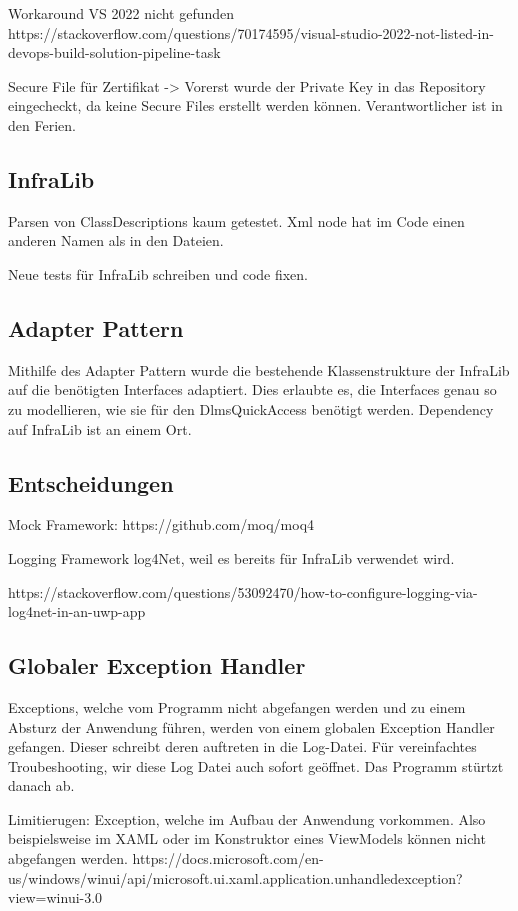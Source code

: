 Workaround VS 2022 nicht gefunden
https://stackoverflow.com/questions/70174595/visual-studio-2022-not-listed-in-devops-build-solution-pipeline-task

Secure File für Zertifikat
-> Vorerst wurde der Private Key in das Repository eingecheckt, da keine Secure Files erstellt werden können. Verantwortlicher ist in den Ferien.


\subsection{InfraLib}
Parsen von ClassDescriptions kaum getestet. Xml node hat im Code einen anderen Namen als in den Dateien.

Neue tests für InfraLib schreiben und code fixen.

\subsection{Adapter Pattern}

Mithilfe des Adapter Pattern wurde die bestehende Klassenstrukture der InfraLib auf die benötigten Interfaces adaptiert.
Dies erlaubte es, die Interfaces genau so zu modellieren, wie sie für den DlmsQuickAccess benötigt werden.
Dependency auf InfraLib ist an einem Ort.


\subsection{Entscheidungen}

Mock Framework:
https://github.com/moq/moq4


Logging Framework
log4Net, weil es bereits für InfraLib verwendet wird. 

https://stackoverflow.com/questions/53092470/how-to-configure-logging-via-log4net-in-an-uwp-app

\subsection{Globaler Exception Handler}

Exceptions, welche vom Programm nicht abgefangen werden und zu einem Absturz der Anwendung führen, werden von einem globalen Exception Handler gefangen.
Dieser schreibt deren auftreten in die Log-Datei. Für vereinfachtes Troubeshooting, wir diese Log Datei auch sofort geöffnet. Das Programm stürtzt danach ab.

Limitierugen:
Exception, welche im Aufbau der Anwendung vorkommen. Also beispielsweise im XAML oder im Konstruktor eines ViewModels können nicht abgefangen werden.
https://docs.microsoft.com/en-us/windows/winui/api/microsoft.ui.xaml.application.unhandledexception?view=winui-3.0


